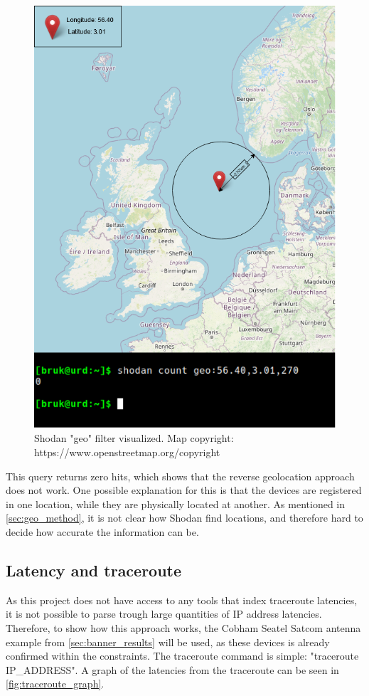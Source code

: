 \begin{figure} [H]
    \centering
    \includegraphics[scale=0.5]{Figurer/geolocation.png}
    \caption{Shodan "geo" filter visualized. Map copyright: https://www.openstreetmap.org/copyright}
    \label{fig:geolocation}
\end{figure}

This query returns zero hits, which shows that the reverse geolocation approach does not work. One possible explanation for this is that the devices are registered in one location, while they are physically located at another. As mentioned in \cref{sec:geo_method}, it is not clear how Shodan find locations, and therefore hard to decide how accurate the information can be.

\subsection{Latency and traceroute} \label{sec:latency_results}
As this project does not have access to any tools that index traceroute latencies, it is not possible to parse trough large quantities of IP address latencies. Therefore, to show how this approach works, the Cobham Seatel Satcom antenna example from \cref{sec:banner_results} will be used, as these devices is already confirmed within the constraints. The traceroute command is simple: "traceroute IP\_ADDRESS". A graph of the latencies from the traceroute can be seen in \cref{fig:traceroute_graph}.

